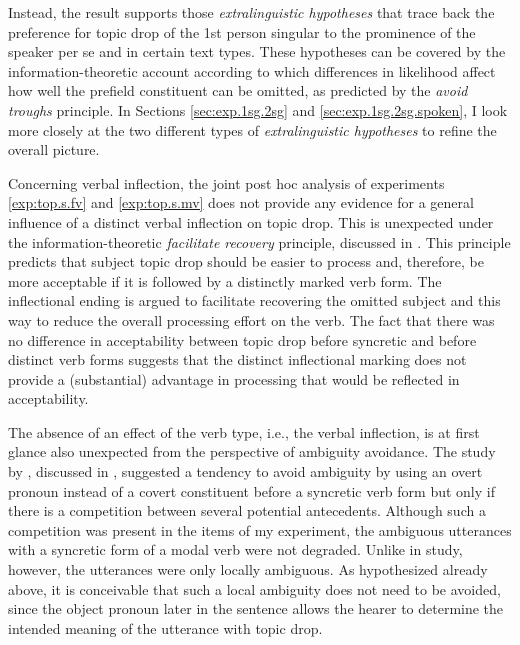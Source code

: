Instead, the result supports those \textit{extralinguistic hypotheses} that trace back the preference for topic drop of the 1st person singular to the prominence of the speaker per se and in certain text types.
These hypotheses can be covered by the information-theoretic account according to which differences in likelihood affect how well the prefield constituent can be omitted, as predicted by the \textit{avoid troughs} principle.
In Sections \ref{sec:exp.1sg.2sg} and \ref{sec:exp.1sg.2sg.spoken}, I look more closely at the two different types of \textit{extralinguistic hypotheses} to refine the overall picture.

Concerning verbal inflection, the joint post hoc analysis of experiments \ref*{exp:top.s.fv} and \ref*{exp:top.s.mv} does not provide any evidence for a general influence of a distinct verbal inflection on topic drop.
This is unexpected under the information-theoretic \textit{facilitate recovery} principle,  discussed in .
This principle predicts that subject topic drop should be easier to process and, therefore, be more acceptable if it is followed by a distinctly marked verb form.
The inflectional ending is argued to facilitate recovering  the omitted subject and this way to reduce the overall processing effort  on the verb.
The fact that there was no difference in acceptability between topic drop before syncretic and before distinct verb forms suggests that the distinct inflectional marking does not provide a (substantial) advantage in processing that would be reflected in acceptability. 

The absence of an effect of the verb type, i.e., the verbal inflection, is at first glance also unexpected from the perspective of ambiguity avoidance.
The study by \citet{soares.etal2019}, discussed in , suggested a tendency to avoid ambiguity by using an overt pronoun instead of a covert constituent before a syncretic  verb form but only if there is a competition between several potential antecedents. 
Although such a competition was present in the items of my experiment, the ambiguous utterances with a syncretic form of a modal verb were not degraded.
Unlike in  study, however, the utterances were only locally ambiguous.
As hypothesized already above, it is conceivable that such a local ambiguity does not need to be avoided, since the object pronoun later in the sentence allows the hearer to determine the intended meaning of the utterance with topic drop. 
  

